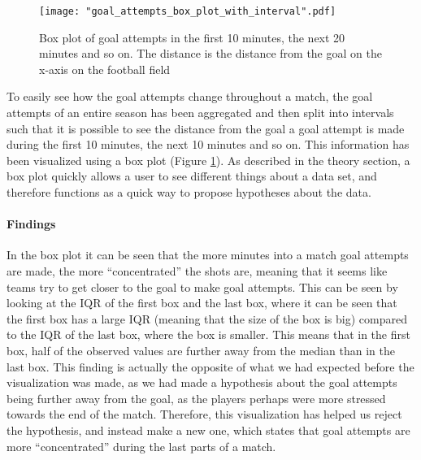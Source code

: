 \documentclass[Report.tex]{subfiles}
\begin{document}
\begin{figure}
\center
\texttt{[image: "goal\_attempts\_box\_plot\_with\_interval".pdf]}
\caption{Box plot of goal attempts in the first 10 minutes, the next 20 minutes and so on. The distance is the distance from the goal on the x-axis on the football field}
\label{Fig:goal_attempts_box_plot}
\end{figure}

To easily see how the goal attempts change throughout a match, the goal attempts of an entire season has been aggregated and then
split into intervals such that it is possible to see the distance from the goal a goal attempt is made during the first 10 minutes, the next
10 minutes and so on. This information has been visualized using a box plot (Figure \ref{Fig:goal_attempts_box_plot}). As described in the theory section, a box plot quickly allows a user to see different things about a data set, and therefore functions as a quick way to propose hypotheses about the data.

\paragraph{Findings\\}
In the box plot it can be seen that the more minutes into a match goal attempts are made, the more ``concentrated'' the shots are, meaning that it seems like teams try to get closer to the goal to make goal attempts. This can be seen by looking at the IQR of the first box and the last box, where it can be seen that the first box has a large IQR (meaning that the size of the box is big) compared to the IQR of the last box, where the box is smaller. This means that in the first box, half of the observed values are further away from the median than in the last box. This finding is actually the opposite of what we had expected before the visualization was made, as we had made a hypothesis about the goal attempts being further away from the goal, as the players perhaps were more stressed towards the end of the match. Therefore, this visualization has helped us reject the hypothesis, and instead make a new one, which states that goal attempts are more ``concentrated'' during the last parts of a match.
 
\end{document}
